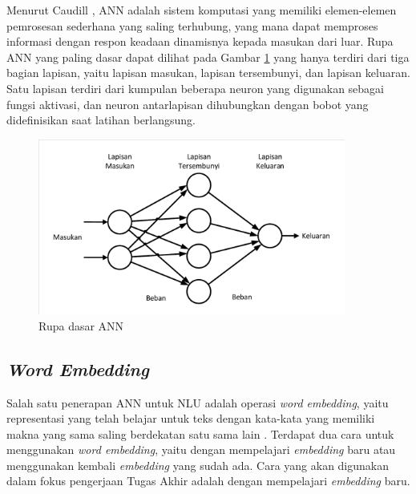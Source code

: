 Menurut Caudill \parencite{caudill1987neural}, ANN adalah sistem komputasi yang memiliki elemen-elemen pemrosesan sederhana yang saling terhubung, yang mana dapat memproses informasi dengan respon keadaan dinamisnya kepada masukan dari luar. Rupa ANN yang paling dasar dapat dilihat pada Gambar \ref{fig:ann} yang hanya terdiri dari tiga bagian lapisan, yaitu lapisan masukan, lapisan tersembunyi, dan lapisan keluaran. Satu lapisan terdiri dari kumpulan beberapa neuron yang digunakan sebagai fungsi aktivasi, dan neuron antarlapisan dihubungkan dengan bobot yang didefinisikan saat latihan berlangsung.
\begin{figure}[ht]
	\centering
	\includegraphics[width=0.9\textwidth, trim=2 2 2 2, clip]{resources/2/ann.pdf}
	\caption{Rupa dasar ANN \parencite{caudill1987neural}}
	\label{fig:ann}
\end{figure}

\subsection{\textit{Word Embedding}}

Salah satu penerapan ANN untuk NLU adalah operasi \textit{word embedding}, yaitu representasi yang telah belajar untuk teks dengan kata-kata yang memiliki makna yang sama saling berdekatan satu sama lain \parencite{brownlee2017what}. Terdapat dua cara untuk menggunakan \textit{word embedding}, yaitu dengan mempelajari \textit{embedding} baru atau menggunakan kembali \textit{embedding} yang sudah ada. Cara yang akan digunakan dalam fokus pengerjaan Tugas Akhir adalah dengan mempelajari \textit{embedding} baru.

